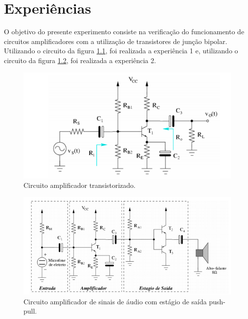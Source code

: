 \documentclass{abntex2}
\begin{document}
\imprimircapa
\imprimirfolhaderosto

\tableofcontents
\clearpage
\listoffigures
\clearpage

\chapter{Experiências}

 O objetivo do presente experimento consiste na verificação do funcionamento
 de circuitos amplificadores com a utilização de transistores de junção bipolar. Utilizando o circuito da
 figura \ref{fig:circuito1}, foi realizada a experiência 1 e, utilizando o circuito da figura \ref{fig:circuito2},
 foi realizada a experiência 2.

\begin{figure}[h]
  \centering
  \includegraphics[scale = 0.5]{circuito1.png}
  \caption{Circuito amplificador transistorizado.}
  \label{fig:circuito1}
\end{figure}

\begin{figure}[h]
  \centering
  \includegraphics[scale = 0.5]{circuito2.png}
  \caption{Circuito amplificador de sinais de áudio com estágio de saída push-pull.}
  \label{fig:circuito2}
\end{figure}
\end{document}
